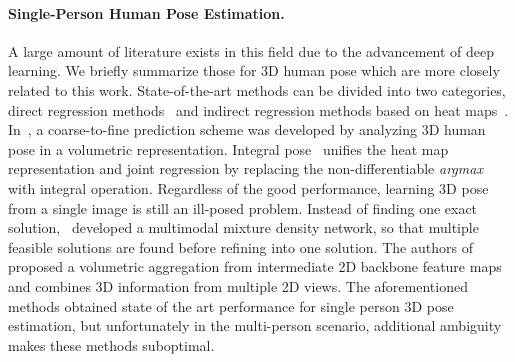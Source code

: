 \documentclass[runningheads]{llncs}
\begin{document}
\paragraph {\bf{Single-Person Human Pose Estimation. }} A large amount of literature exists in this field due to the advancement of deep learning. We briefly summarize those for 3D human pose which are more closely related to this work. State-of-the-art methods can be divided into two categories, direct regression methods~\cite{chen20173d,jahangiri2017generating,mahendran20173d} and indirect regression methods based on heat maps~\cite{iskakov2019learnable,li2019generating,xzhou1}.  In~\cite{xzhou1},  a coarse-to-fine prediction scheme was developed by analyzing 3D human pose in a volumetric representation. Integral pose~\cite{sun2018integral} unifies the heat map representation and joint regression by replacing the non-differentiable \textit{argmax} with integral operation. Regardless of the good performance, learning 3D pose from a single image is still an  ill-posed problem. Instead of finding one exact solution,~\cite{li2019generating} developed a multimodal mixture density network, so that multiple feasible solutions are found before refining into one solution. The authors of~\cite{iskakov2019learnable} proposed a volumetric aggregation from intermediate 2D backbone feature maps and combines 3D information from multiple 2D views. The aforementioned methods obtained state of the art performance for single person 3D pose estimation, but unfortunately in the multi-person scenario, additional ambiguity makes these methods suboptimal.
\end{document}
